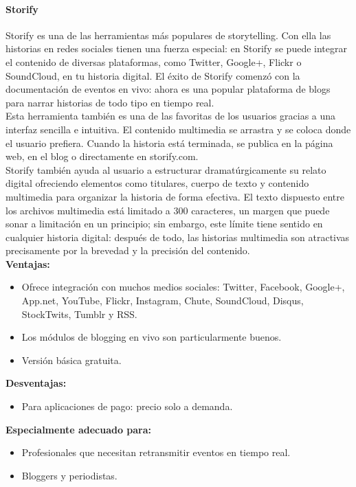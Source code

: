 \documentclass[twoside,twocolumn]{article}
\begin{document}
\paragraph{\Large Storify \\[0.1in]}
Storify es una de las herramientas más populares de storytelling. Con ella las historias en redes sociales tienen una fuerza especial: en Storify se puede integrar el contenido de diversas plataformas, como Twitter, Google+, Flickr o SoundCloud, en tu historia digital. El éxito de Storify comenzó con la documentación de eventos en vivo: ahora es una popular plataforma de blogs para narrar historias de todo tipo en tiempo real.\\[0.1in]
Esta herramienta también es una de las favoritas de los usuarios gracias a una interfaz sencilla e intuitiva. El contenido multimedia se arrastra y se coloca donde el usuario prefiera. Cuando la historia está terminada, se publica en la página web, en el blog o directamente en storify.com.\\[0.1in]
Storify también ayuda al usuario a estructurar dramatúrgicamente su relato digital ofreciendo elementos como titulares, cuerpo de texto y contenido multimedia para organizar la historia de forma efectiva. El texto dispuesto entre los archivos multimedia está limitado a 300 caracteres, un margen que puede sonar a limitación en un principio; sin embargo, este límite tiene sentido en cualquier historia digital: después de todo, las historias multimedia son atractivas precisamente por la brevedad y la precisión del contenido.\\

\noindent
\textbf{\large Ventajas:}
\begin{itemize}
    \item Ofrece integración con muchos medios sociales: Twitter, Facebook, Google+, App.net, YouTube, Flickr, Instagram, Chute, SoundCloud, Disqus, StockTwits, Tumblr y RSS.
    \item Los módulos de blogging en vivo son particularmente buenos.
    \item Versión básica gratuita.
\end{itemize}
\textbf{\large Desventajas:}
\begin{itemize}
    \item Para aplicaciones de pago: precio solo a demanda.
\end{itemize}
\textbf{\large Especialmente adecuado para:}
\begin{itemize}
    \item Profesionales que necesitan retransmitir eventos en tiempo real.
    \item Bloggers y periodistas.
\end{itemize}
\end{document}
